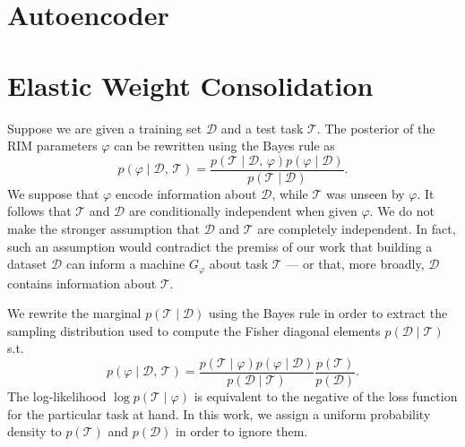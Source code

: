 \documentclass[twocolumn]{aastex631}
\begin{document}
\section{Autoencoder}\label{ap:AE}



\section{Elastic Weight Consolidation}\label{ap:ewc}
Suppose we are given a training set $\mathcal{D}$ and a test task $\mathcal{T}$. The 
posterior of the RIM parameters $\mathcal{\varphi}$ can be rewritten using the Bayes rule as
\begin{equation}
        p(\varphi \mid \mathcal{D},\, \mathcal{T}) = 
        \frac{p(\mathcal{T} \mid \mathcal{D},\, \varphi) p(\varphi \mid \mathcal{D})}
        {p(\mathcal{T} \mid \mathcal{D})}.
\end{equation} 
We suppose that $\varphi$ encode 
information about $\mathcal{D}$, while $\mathcal{T}$ was unseen by $\varphi$. 
It follows that 
$\mathcal{T}$ and $\mathcal{D}$ are conditionally independent when given $\varphi$. 
We do not make the stronger assumption that $\mathcal{D}$ and $\mathcal{T}$ 
are completely independent. In fact, such an assumption 
would contradict the premiss of our work that building a 
dataset $\mathcal{D}$ can inform a machine $G_\varphi$ about
task $\mathcal{T}$ --- or that, more broadly, $\mathcal{D}$ 
contains information about $\mathcal{T}$.

We rewrite the marginal $p(\mathcal{T} \mid \mathcal{D})$ using the Bayes rule
in order to extract the sampling distribution used to compute 
the Fisher diagonal elements $p(\mathcal{D} \mid \mathcal{T})$ s.t.
\begin{equation}
        p(\varphi \mid \mathcal{D},\, \mathcal{T}) = 
\frac{p(\mathcal{T} \mid \varphi) p(\varphi \mid \mathcal{D})}
        {p(\mathcal{D} \mid \mathcal{T})}
        \frac{p(\mathcal{T})}{p(\mathcal{D})}.
\end{equation} 
The log-likelihood $\log p(\mathcal{T} \mid \varphi)$ is equivalent to 
the negative of the loss function for the particular task at hand.
In this work, we assign a uniform probability density to $p(\mathcal{T})$ and $p(\mathcal{D})$ 
in order to ignore them.
\end{document}
